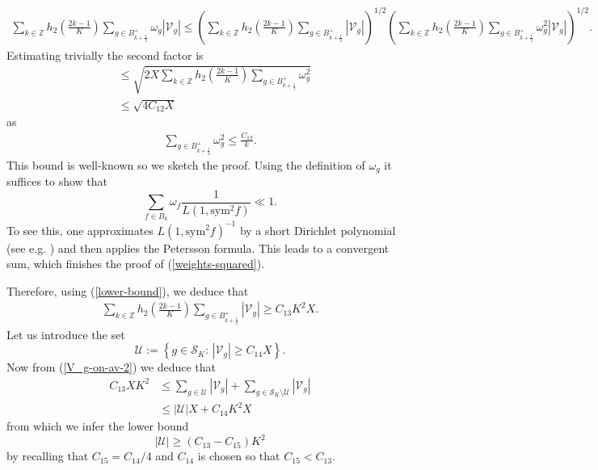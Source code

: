 \documentclass[a4paper,10pt,twoside]{amsart}
\theoremstyle{definition}
\numberwithin{equation}{section}
\newcommand\Z{\mathbb{Z}}
\renewcommand\:{\colon}
\begin{document}
\begin{align*}
\sum_{k\in\Z}h_2\left(\frac{2k-1}K\right)\sum_{g\in B_{k+\frac12}^+}\omega_g\left|\mathcal V_g\right|\leq \left(\sum_{k\in\Z}h_2\left(\frac{2k-1}K\right)\sum_{g\in B_{k+\frac12}^+}|\mathcal V_g|\right)^{1/2}\left(\sum_{k\in\Z}h_2\left(\frac{2k-1}K\right)\sum_{g\in B_{k+\frac12}^+}\omega_g^2|\mathcal V_g|\right)^{1/2}.
\end{align*}
Estimating trivially the second factor is
\begin{align*}
&\leq \sqrt{2X\sum_{k\in\Z}h_2\left(\frac{2k-1}K\right)\sum_{g\in B_{k+\frac12}^+}\omega_g^2}\\
&\leq\sqrt{4C_{12}X}
\end{align*}
as
\begin{align}\label{weights-squared}
\sum_{g\in B_{k+\frac12}^+}\omega_g^2\leq\frac{C_{12}}k.
\end{align}
This bound is well-known so we sketch the proof. Using the definition of $\omega_g$ it suffices to show that 
\[
\sum_{f\in B_k}\omega_f\frac1{L(1,\text{sym}^2f)}\ll 1. 
\]
To see this, one approximates $L(1,\text{sym}^2f)^{-1}$ by a short Dirichlet polynomial (see e.g. \cite[Proof of Lemma 8.9.]{Balkanova-Frolenkov2021}) and then applies the Petersson formula. This leads to a convergent sum, which finishes the proof of (\ref{weights-squared}).

Therefore, using (\ref{lower-bound}), we deduce that  
\begin{align}\label{V_g-on-av-2}
\sum_{k\in\Z}h_2\left(\frac{2k-1}K\right)\sum_{g\in B_{k+\frac12}^+}|\mathcal V_g|\geq C_{13} K^2X. 
\end{align}
Let us introduce the set
\[\mathcal U:=\left\{g\in\mathcal S_K:\,|\mathcal V_g|\geq C_{14}X\right\}.
\]
Now from (\ref{V_g-on-av-2}) we deduce that 
\begin{align*}
C_{13}XK^2&\leq\sum_{g\in\mathcal U}\left|\mathcal V_g\right|+\sum_{g\in \mathcal S_K\setminus\mathcal U}\left|\mathcal V_g\right|\\
&\leq |\mathcal U|X+C_{14}K^2 X
\end{align*}
from which we infer the lower bound 
\[|\mathcal U|\geq(C_{13}-C_{15})K^2
\]
by recalling that $C_{15}=C_{14}/4$ and $C_{14}$ is chosen so that $C_{15}<C_{13}$. 
\end{document}
